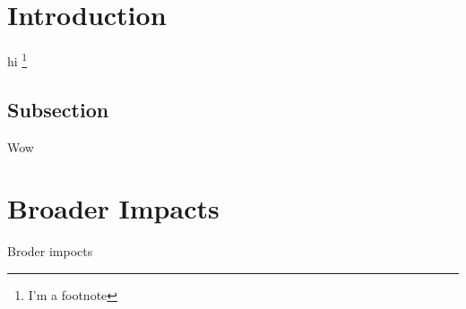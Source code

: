 \documentclass[11pt]{article}
\begin{document}
\pagestyle{empty} 
\setlength{\baselineskip}{12.6pt} 

\section{Introduction\label{sec:intro}}

hi  \cite{matthis_gaze_2018}
\footnote{I'm a footnote}


\subsection{Subsection}
 Wow \cite{cao_openpose_2018}


\section{Broader Impacts\label{sec:BI}}

Broder impocts

\newpage
\printbibliography
\end{document}
